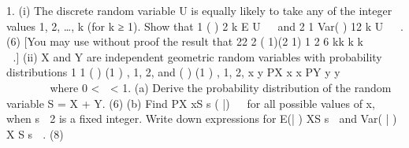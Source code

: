 1. (i) The discrete random variable U is equally likely to take any of the integer
values 1, 2, …, k (for k ≥ 1). Show that 1 ( ) 2
k E U   and
2 1 Var( ) 12
k U   .
(6)
[You may use without proof the result that 22 2 ( 1)(2 1) 1 2
6
kk k k  
    .]
(ii) X and Y are independent geometric random variables with probability
distributions
1
1
( ) (1 ) , 1, 2,
and ( ) (1 ) , 1, 2,
x
y
PX x x
PY y y
 
 


  
  


where 0 <  < 1.
(a) Derive the probability distribution of the random variable S = X + Y.
(6)
(b) Find PX xS s ( |)   for all possible values of x, when s  2 is a fixed
integer. Write down expressions for E(| ) XS s  and Var( | ) X S s  .
(8) 
